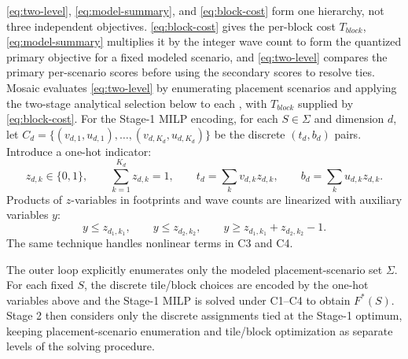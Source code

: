 \documentclass[acmsmall,review,anonymous,screen]{acmart}
\makeatletter
\newif\ifrevmarkup %
\DeclareRobustCommand{\revRtwo}[1]{\ifrevmarkup{\color{revRtwo}\hypersetup{allcolors=revRtwo}#1}\else#1\fi} %
\DeclareRobustCommand{\revRthree}[1]{\ifrevmarkup{\color{revRthree}\hypersetup{allcolors=revRthree}#1}\else#1\fi} %
\let\revRtwo\@firstofone\let\revRthree\@firstofone} %
\newcommand{\name}{{Mosaic}\xspace}
\newcommand{\tile}{t}
\providecommand{\DIFaddbegin}{} %
\providecommand{\DIFaddend}{} %
\newcommand{\DIFaddincludegraphics}[2][]{{\color{blue}\fbox{\DIFOincludegraphics[#1]{#2}}}} %
\DeclareRobustCommand{\DIFaddbegin}{\DIFOaddbegin \let\includegraphics\DIFaddincludegraphics} %
\DeclareRobustCommand{\DIFaddend}{\DIFOaddend \let\includegraphics\DIFOincludegraphics} %
\makeatother
\begin{document}
\autoref{eq:two-level}, \autoref{eq:model-summary}, and \autoref{eq:block-cost} form one hierarchy, not three independent objectives. \autoref{eq:block-cost} gives the per-block cost \(T_{\mathit{block}}\), \autoref{eq:model-summary} multiplies it by the integer wave count to form the quantized primary objective for a fixed modeled scenario, and \autoref{eq:two-level} compares the primary per-scenario scores before using the secondary scores to resolve ties. \name evaluates \autoref{eq:two-level} by enumerating placement scenarios and applying the two-stage analytical selection below to each \DIFaddbegin \revRtwo{(Algorithm~\ref{alg:mosaic})}\DIFaddend , with \(T_{\mathit{block}}\) supplied by \autoref{eq:block-cost}. For the Stage-1 MILP encoding, for each \(S\in\Sigma\) and dimension \(d\), let
\(C_d=\{(v_{d,1},u_{d,1}),\ldots,(v_{d,K_d},u_{d,K_d})\}\) be the discrete
\((\tile_d,b_d)\) pairs. Introduce a one-hot indicator:
\[
z_{d,k}\in\{0,1\},
\qquad \sum_{k=1}^{K_d}z_{d,k}=1,
\qquad \tile_d=\sum_k v_{d,k}z_{d,k},
\qquad b_d=\sum_k u_{d,k}z_{d,k}.
\]
Products of \(z\)-variables in footprints and wave counts are linearized with
auxiliary variables \(y\):
\[
y\le z_{d_1,k_1},
\qquad y\le z_{d_2,k_2},
\qquad y\ge z_{d_1,k_1}+z_{d_2,k_2}-1.
\]
The same technique handles nonlinear terms in C3 and C4.

The outer loop explicitly enumerates only the modeled placement-scenario set \(\Sigma\). For each fixed \(S\), the discrete tile/block choices are encoded by the one-hot variables above and the Stage-1 MILP is solved under C1--C4 to obtain \(F^*(S)\). Stage 2 then considers only the discrete assignments tied at the Stage-1 optimum, keeping placement-scenario enumeration and tile/block optimization as separate levels of the solving procedure.
\end{document}
